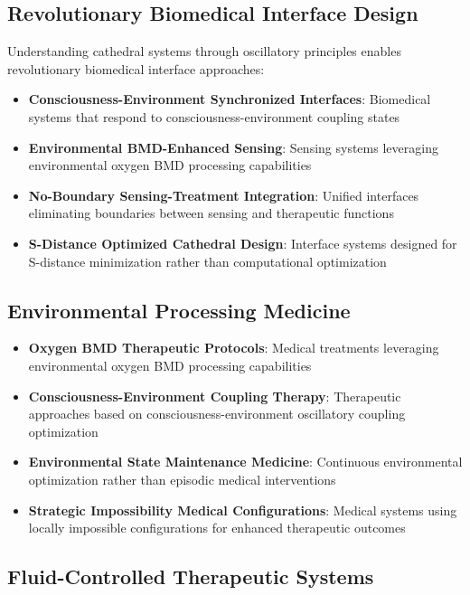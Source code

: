 \documentclass[12pt,a4paper]{article}
\begin{document}
\subsection{Revolutionary Biomedical Interface Design}

Understanding cathedral systems through oscillatory principles enables revolutionary biomedical interface approaches:

\begin{itemize}
\item \textbf{Consciousness-Environment Synchronized Interfaces}: Biomedical systems that respond to consciousness-environment coupling states
\item \textbf{Environmental BMD-Enhanced Sensing}: Sensing systems leveraging environmental oxygen BMD processing capabilities
\item \textbf{No-Boundary Sensing-Treatment Integration}: Unified interfaces eliminating boundaries between sensing and therapeutic functions
\item \textbf{S-Distance Optimized Cathedral Design}: Interface systems designed for S-distance minimization rather than computational optimization
\end{itemize}

\subsection{Environmental Processing Medicine}

\begin{itemize}
\item \textbf{Oxygen BMD Therapeutic Protocols}: Medical treatments leveraging environmental oxygen BMD processing capabilities
\item \textbf{Consciousness-Environment Coupling Therapy}: Therapeutic approaches based on consciousness-environment oscillatory coupling optimization
\item \textbf{Environmental State Maintenance Medicine}: Continuous environmental optimization rather than episodic medical interventions
\item \textbf{Strategic Impossibility Medical Configurations}: Medical systems using locally impossible configurations for enhanced therapeutic outcomes
\end{itemize}

\subsection{Fluid-Controlled Therapeutic Systems}
\end{document}
